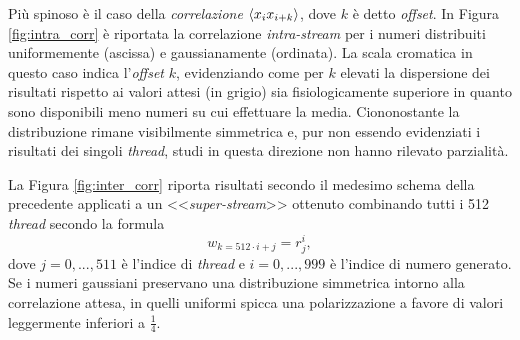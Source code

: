Più spinoso è il caso della \textit{correlazione} $\braket{x_i x_{i+k}}$, dove $k$ è detto \textit{offset}. In Figura \ref{fig:intra_corr} è riportata la correlazione \textit{intra-stream} per i numeri distribuiti uniformemente (ascissa) e gaussianamente (ordinata). La scala cromatica in questo caso indica l'\textit{offset} $k$, evidenziando come per $k$ elevati la dispersione dei risultati rispetto ai valori attesi (in grigio) sia fisiologicamente superiore in quanto sono disponibili meno numeri su cui effettuare la media. Ciononostante la distribuzione rimane visibilmente simmetrica e, pur non essendo evidenziati i risultati dei singoli \textit{thread}, studi in questa direzione non hanno rilevato parzialità.

La Figura \ref{fig:inter_corr} riporta risultati secondo il medesimo schema della precedente applicati a un <<\textit{super-stream}>> ottenuto combinando tutti i 512 \textit{thread} secondo la formula
\begin{equation}
    w_{k=512 \cdot i+j} = r_j^i,
    \label{eq:superstream}
\end{equation}
dove $j=0,...,511$ è l'indice di \textit{thread} e $i=0,...,999$ è l'indice di numero generato. Se i numeri gaussiani preservano una distribuzione simmetrica intorno alla correlazione attesa, in quelli uniformi spicca una polarizzazione a favore di valori leggermente inferiori a $\frac{1}{4}$.

